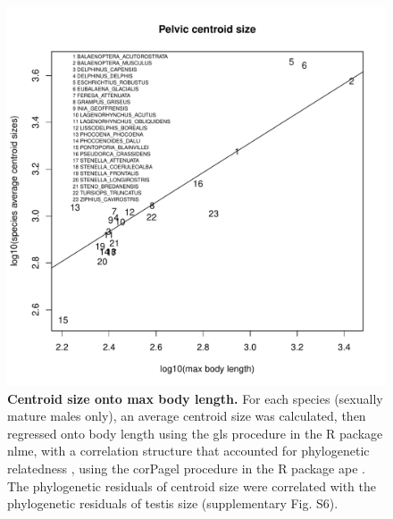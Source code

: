 \documentclass[12pt]{article}
\begin{document}
\begin{figure}
\begin{center}
  \includegraphics[width=\textwidth]{S5}
\end{center}
\caption{
\textbf{Centroid size onto max body length.} 
For each species (sexually mature males only), an average centroid size was calculated, then regressed onto body length using the gls procedure in the R package nlme, with a correlation structure that accounted for phylogenetic relatedness \citep{pagel1999}, using the corPagel procedure in the R package ape \citep{paradis2004}.  The phylogenetic residuals of centroid size were correlated with the phylogenetic residuals of testis size (supplementary Fig. S6). 
}
\end{figure}
\end{document}
